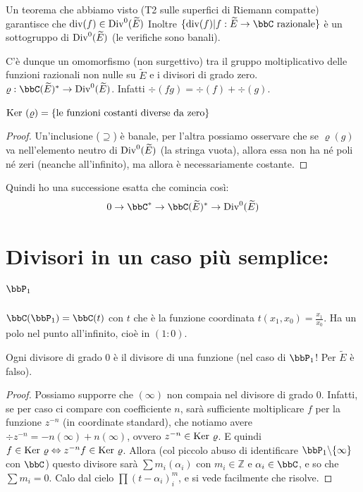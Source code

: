 Un teorema che abbiamo visto (T2 sulle superfici di Riemann compatte) garantisce che $\mbox{div}(f) \in \mbox{Div}^0(\widetilde{E})$
Inoltre $\{\div(f) | f: \widetilde{E} \rar \bbC \mbox{ razionale} \}$ è un sottogruppo di $\mbox{Div}^0(\widetilde{E})$ (le verifiche sono banali).

C'è dunque un omomorfismo (non surgettivo) tra il gruppo moltiplicativo delle funzioni razionali non nulle su $\widetilde{E}$ e i divisori di grado zero.
$\varrho: \bbC(\widetilde E)^* \rightarrow \Div^0(\widetilde{E})$. Infatti $\div(fg)=\div(f)+\div(g)$.

\begin{proposizione}
$\mbox{Ker }(\varrho) = \{\text{le funzioni costanti diverse da zero}\}$
\end{proposizione}
\begin{proof}
Un'inclusione ($\supseteq$) è banale, per l'altra possiamo osservare che se $\varrho(g)$ va nell'elemento
neutro di $\mbox{Div}^0(\widetilde{E})$ (la stringa vuota), allora essa non ha né poli né zeri (neanche all'infinito), ma allora è necessariamente costante.
\end{proof}

\begin{osservazione}
Quindi ho una successione esatta che comincia così:
$$0 \rightarrow \bbC^* \rightarrow \bbC(\widetilde{E})^* \rightarrow \Div^0(\widetilde{E})$$
\end{osservazione}


\section{Divisori in un caso più semplice: $\bbP_1$}
$\bbC(\bbP_1) = \bbC(t)$ con $t$ che è la funzione coordinata $t(x_1, x_0)=\frac{x_1}{x_0}$.
Ha un polo nel punto all'infinito, cioè in $(1:0)$.

\begin{proposizione}
Ogni divisore di grado $0$ è il divisore di una funzione (nel caso di $\bbP_1$! Per $\widetilde E$ è falso).
\end{proposizione}
\begin{proof}
	Possiamo supporre che $(\infty)$ non compaia nel divisore di grado $0$.
  Infatti, se per caso ci compare con coefficiente $n$, sarà sufficiente moltiplicare $f$ per la funzione $z^{-n}$ (in coordinate standard), che notiamo avere $\div z^{-n} = -n (\infty) + n (\infty)$, ovvero $z^{-n} \in \mbox{Ker } \varrho$. E quindi $f \in \mbox{Ker } \varrho \Leftrightarrow z^{-n} f \in \mbox{Ker } \varrho$.
	Allora (col piccolo abuso di identificare $\bbP_1 \backslash \{\infty\}$ con $\bbC$)
questo divisore sarà $\sum m_i (\alpha_i)$ con $m_i \in \mathbb{Z}$ e $\alpha_i \in \bbC$, e so che $\sum m_i=0$.
Calo dal cielo $\prod(t-\alpha_i)^m_i$, e si vede facilmente che risolve.
\end{proof}

